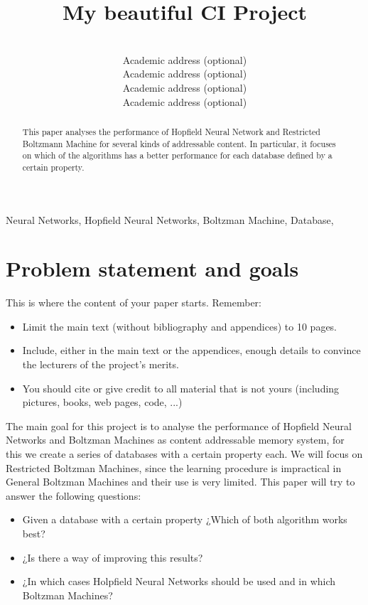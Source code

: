 \documentclass[anon]{CI}
\title[My CI Project]{My beautiful CI Project}
\author{
 \Name{Javier Beltr{\'a}n} \Email{javierbeltranj@gmail.com}\\
 \addr Academic address (optional)
 \AND
 \Name{Guillermo Bern{\'e}rdez} \Email{gbg1441@gmail.com}\\
 \addr Academic address (optional)
 \AND
 \Name{Juan Lao} \Email{nitzing@gmail.com}\\
 \addr Academic address (optional)
 \AND
 \Name{Jorge Rodr{\'i}guez} \Email{j.rodriguez.molinuevo@gmail.com}\\
 \addr Academic address (optional)
 }
\begin{document}
\maketitle

\begin{abstract}
This paper analyses the performance of Hopfield Neural Network and Restricted Boltzmann Machine for several kinds of addressable content. In particular, it focuses on which of the algorithms has a better performance for each database defined by a certain property. 
\end{abstract}

\begin{keywords}
Neural Networks, Hopfield Neural Networks, Boltzman Machine, Database, 
\end{keywords}


\section{Problem statement and goals}

This is where the content of your paper starts. Remember:
\begin{itemize}
\item Limit the main text (without bibliography and appendices) to 10 pages.
\item Include, either in the main text or the appendices, enough details to convince the lecturers of the project's merits.
\item You should cite or give credit to all material that is not yours (including pictures, books, web pages, code, ...)
\end{itemize}

The main goal for this project is to analyse the performance of Hopfield Neural Networks and Boltzman Machines as content addressable memory system, for this we create a series of databases with a certain property each. We will focus on Restricted Boltzman Machines, since the learning procedure is impractical in General Boltzman Machines and their use is very limited. This paper will try to answer the following questions:

\begin{itemize}
	\item Given a database with a certain property ¿Which of both algorithm works best?
	\item ¿Is there a way of improving this results?
	\item ¿In which cases Holpfield Neural Networks should be used and in which Boltzman Machines?
\end{itemize}
\end{document}
